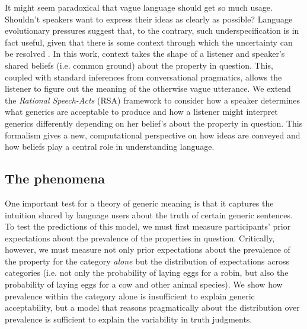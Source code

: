 \documentclass[10pt,letterpaper]{article}
\begin{document}
It might seem paradoxical that vague language should get so much usage. 
Shouldn't speakers want to express their ideas as clearly as possible?
Language evolutionary pressures suggest that, to the contrary, such underspecification is in fact useful, given that there is some context through which the uncertainty can be resolved \cite{Piantadosi2012}.
In this work, context takes the shape of a listener and speaker's shared beliefs (i.e. common ground) about the property in question. This, coupled with 
standard inferences from conversational pragmatics, allows the listener to figure out the meaning of the otherwise vague utterance.
We extend the \emph{Rational Speech-Acts} (RSA) framework \cite{Frank2012,Goodman2013} to consider how a speaker determines what generics are acceptable to produce and how a listener might interpret generics differently depending on her belief's about the property in question. 
This formalism gives a new, computational perspective on how ideas are conveyed and how beliefs play a central role in understanding language.


%
\subsection{The phenomena}

One important test for a theory of generic meaning is that it captures the intuition shared by language users about the truth of certain generic sentences. To test the predictions of this model, we must first measure participants' prior expectations about the prevalence of the properties in question. Critically, however, we must measure not only prior expectations about the prevalence of the property for the category \emph{alone} but the distribution of expectations across categories (i.e. not only the probability of laying eggs for a robin, but also the probability of laying eggs for a cow and other animal species).  
We show how prevalence within the category alone is insufficient to explain generic acceptability, but a model that reasons pragmatically about the distribution over prevalence is sufficient to explain the variability in truth judgments.
\end{document}

